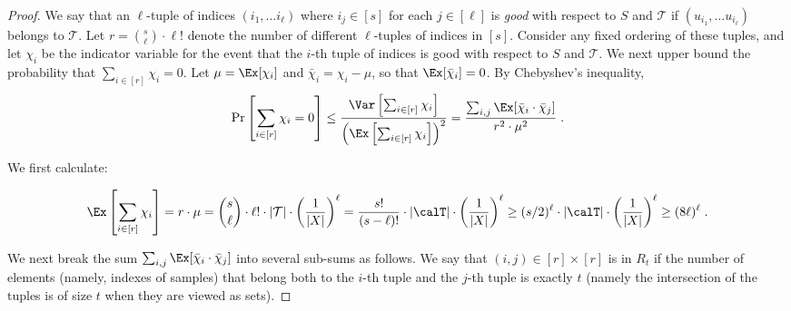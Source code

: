 \begin{proof}
We say that an $\ell$-tuple of indices $(i_1, \ldots i_\ell)$ where $i_j \in [s]$ for each $j\in [\ell]$ is \emph{good} with respect to $S$ and $\mathcal{T}$ if $(u_{i_1}, \ldots u_{i_\ell})$ belongs to $\mathcal{T}$.
Let $r = {s \choose \ell } \cdot \ell!$ denote the number of different $\ell$-tuples of indices in $[s]$.  %
Consider any fixed ordering of these tuples, and let $\chi_i$ 
be the indicator variable for the event that the $i$-th tuple of indices is good with respect to $S$ and $\mathcal{T}$.
We next upper bound the probability that
$\sum_{i \in [r]} \chi_{i}=0$.
Let $\mu = \Ex[\chi_i]$ and $\bar{\chi}_{i} = \chi_{i} - \mu$, so that $\Ex[\bar{\chi}_{i}] = 0$.
By Chebyshev's inequality,
\begin{equation}\label{eq:cheb-Ck}
\Pr\left[\sum_{i\in [r]}\chi_{i}=0\right] \leq \frac{\Var\left[\sum_{i\in [r]}\chi_{i}\right]}{\left(\Ex\left[\sum_{i\in [r]}\chi_{i}\right]\right)^2}
= \frac{\sum_{i,j} \Ex[\bar{\chi}_{i}\cdot \bar{\chi}_{j}]}{r^2\cdot \mu^2} \;.
\end{equation}

We first calculate:

\begin{equation}
\Ex\left[\sum_{i\in [r]}\chi_{i}\right] = r \cdot \mu = {s \choose \ell } \cdot \ell! \cdot |\mathcal{T}| \cdot \left(\frac{1}{|X|}\right)^{\ell}
= \frac{s!}{(s-\ell)!} \cdot |\calT| \cdot \left(\frac{1}{|X|}\right)^{\ell} \geq (s/2)^\ell \cdot |\calT| \cdot \left(\frac{1}{|X|}\right)^{\ell}  \geq (8\ell)^\ell\;.
\end{equation}

We next break the sum $\sum_{i,j} \Ex[\bar{\chi}_{i}\cdot \bar{\chi}_{j}]$ into several sub-sums as follows.
We say that $(i,j) \in [r]\times [r]$ is in $R_t$ if the number of elements (namely, indexes of samples) that belong both to the $i$-th tuple and the $j$-th tuple is exactly $t$ (namely the intersection of the tuples is of size $t$ when they are viewed as sets).


\end{proof}
